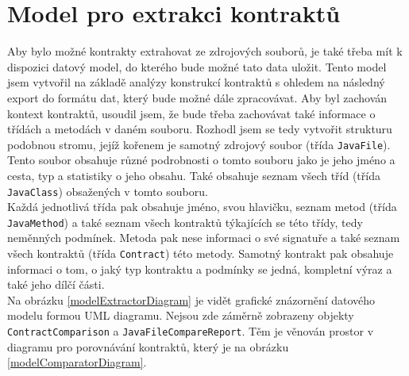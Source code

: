 	
	\section{Model pro extrakci kontraktů}
			Aby bylo možné kontrakty extrahovat ze zdrojových souborů, je také třeba mít k dispozici datový model, do kterého bude možné tato data uložit. Tento model jsem vytvořil na základě analýzy konstrukcí kontraktů s ohledem na následný export do formátu dat, který bude možné dále zpracovávat. Aby byl zachován kontext kontraktů, usoudil jsem, že bude třeba zachovávat také informace o třídách a metodách v daném souboru. Rozhodl jsem se tedy vytvořit strukturu podobnou stromu, jejíž kořenem je samotný zdrojový soubor (třída \texttt{JavaFile}). Tento soubor obsahuje různé podrobnosti o tomto souboru jako je jeho jméno a cesta, typ a statistiky o jeho obsahu. Také obsahuje seznam všech tříd (třída \texttt{JavaClass}) obsažených v tomto souboru.\\
			
			Každá jednotlivá třída pak obsahuje jméno, svou hlavičku, seznam metod (třída \texttt{JavaMethod}) a také seznam všech kontraktů týkajících se této třídy, tedy neměnných podmínek. Metoda pak nese informaci o své signatuře a také seznam všech kontraktů (třída \texttt{Contract}) této metody. Samotný kontrakt pak obsahuje informaci o tom, o jaký typ kontraktu a podmínky se jedná, kompletní výraz a také jeho dílčí části.\\
			
			Na obrázku \ref{modelExtractorDiagram} je vidět grafické znázornění datového modelu formou UML diagramu. Nejsou zde záměrně zobrazeny objekty \texttt{ContractComparison} a \texttt{JavaFileCompareReport}. Těm je věnován prostor v diagramu pro porovnávání kontraktů, který je na obrázku \ref{modelComparatorDiagram}.\\ 
			
				
